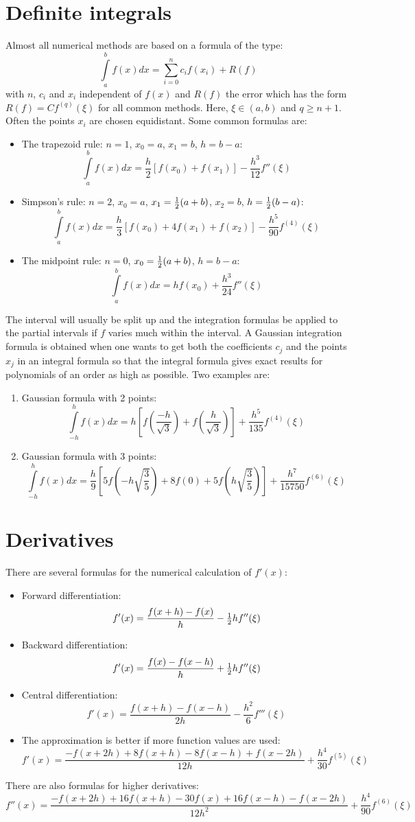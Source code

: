 \documentclass[a4paper,fancyheadings,twoside]{report}
\begin{document}
\section{Definite integrals}
Almost all numerical methods are based on a formula of the type:
\[
\int\limits_a^bf(x)dx=\sum_{i=0}^nc_if(x_i)+R(f)
\]
with $n$, $c_i$ and $x_i$ independent of $f(x)$ and $R(f)$ the error which
has the form $R(f)=Cf^{(q)}(\xi)$ for all common methods. Here, $\xi\in(a,b)$
and $q\geq n+1$. Often the points $x_i$ are chosen equidistant.
Some common formulas are:
\begin{itemize}
\item The trapezoid rule: $n=1$, $x_0=a$, $x_1=b$, $h=b-a$:
\[
\int\limits_a^bf(x)dx=\frac{h}{2}[f(x_0)+f(x_1)]-\frac{h^3}{12}f''(\xi)
\]
\item Simpson's rule: $n=2$, $x_0=a$, $x_1=\mbox{$\frac{1}{2}$}(a+b)$, $x_2=b$, $h=\mbox{$\frac{1}{2}$}(b-a)$:
\[
\int\limits_a^bf(x)dx=\frac{h}{3}[f(x_0)+4f(x_1)+f(x_2)]-\frac{h^5}{90}f^{(4)}(\xi)
\]
\item The midpoint rule: $n=0$, $x_0=\mbox{$\frac{1}{2}$}(a+b)$, $h=b-a$:
\[
\int\limits_a^bf(x)dx=hf(x_0)+\frac{h^3}{24}f''(\xi)
\]
\end{itemize}
The interval will usually be split up and the integration formulas be
applied to the partial intervals if $f$ varies much within the interval.
\npar
A Gaussian integration formula is obtained when one wants to get both the
coefficients $c_j$ and the points $x_j$ in an integral formula so that the
integral formula gives exact results for polynomials of an order as high as
possible. Two examples are:
\begin{enumerate}
\item Gaussian formula with 2 points:
\[
\int\limits_{-h}^hf(x)dx=h\left[f\left(\frac{-h}{\sqrt{3}}\right)+f\left(\frac{h}{\sqrt{3}}\right)\right]+\frac{h^5}{135}f^{(4)}(\xi)
\]
\item Gaussian formula with 3 points:
\[
\int\limits_{-h}^hf(x)dx=\frac{h}{9}\left[5f\left(-h\sqrt{\mbox{$\frac{3}{5}$}}\right)+8f(0)+5f\left(h\sqrt{\mbox{$\frac{3}{5}$}}\right)\right]+\frac{h^7}{15750}f^{(6)}(\xi)
\]
\end{enumerate}

\section{Derivatives}
There are several formulas for the numerical calculation of $f'(x)$:
\begin{itemize}
\item Forward differentiation:
\[
f'(x)=\frac{f(x+h)-f(x)}{h}-\mbox{$\frac{1}{2}$} hf''(\xi)
\]
\item Backward differentiation:
\[
f'(x)=\frac{f(x)-f(x-h)}{h}+\mbox{$\frac{1}{2}$} hf''(\xi)
\]
\item Central differentiation:
\[
f'(x)=\frac{f(x+h)-f(x-h)}{2h}-\frac{h^2}{6}f'''(\xi)
\]
\item The approximation is better if more function values are used:
\[
f'(x)=\frac{-f(x+2h)+8f(x+h)-8f(x-h)+f(x-2h)}{12h}+\frac{h^4}{30}f^{(5)}(\xi)
\]
\end{itemize}
There are also formulas for higher derivatives:
\[
f''(x)=\frac{-f(x+2h)+16f(x+h)-30f(x)+16f(x-h)-f(x-2h)}{12h^2}+\frac{h^4}{90}f^{(6)}(\xi)
\]
\end{document}
